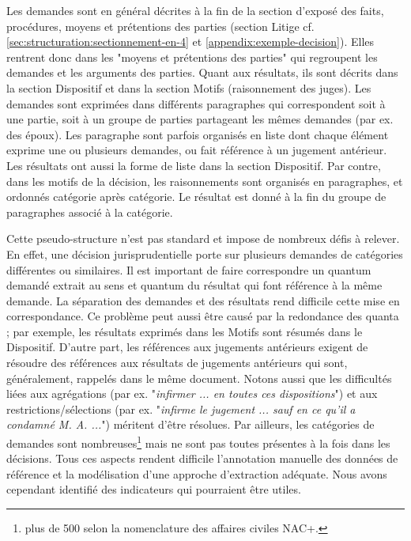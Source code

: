 Les demandes sont en général décrites à la fin de la section d'exposé des faits, procédures, moyens et prétentions des parties (section Litige cf. \ref{sec:structuration:sectionnement-en-4} et \ref{appendix:exemple-decision}). Elles rentrent donc dans les "moyens et prétentions des parties" qui regroupent les demandes et les arguments des parties. Quant aux résultats, ils sont décrits dans la section Dispositif et dans la section Motifs (raisonnement des juges). Les demandes sont exprimées dans différents paragraphes qui correspondent soit à une partie, soit à un groupe de parties partageant les mêmes demandes (par ex. des époux). Les paragraphe sont parfois organisés en liste dont chaque élément exprime une ou plusieurs demandes, ou fait référence à un jugement antérieur. Les résultats ont aussi la forme de liste dans la section Dispositif. Par contre, dans les motifs de la décision, les raisonnements sont organisés en paragraphes, et ordonnés catégorie après catégorie. Le résultat est donné à la fin du groupe de paragraphes associé à la catégorie.


 Cette pseudo-structure n'est pas standard et impose de nombreux défis à relever. En effet, une décision jurisprudentielle porte sur plusieurs demandes de catégories différentes ou similaires. Il est important de faire correspondre un quantum demandé extrait au sens et quantum du résultat qui font référence à la même demande. La séparation des demandes et des résultats rend difficile cette mise en correspondance. Ce problème peut aussi être causé par la redondance des quanta ; par exemple, les résultats exprimés dans les Motifs sont résumés dans le Dispositif. D'autre part, les références aux jugements antérieurs exigent de résoudre des références aux résultats de jugements antérieurs qui sont, généralement, rappelés dans le même document. Notons aussi que les difficultés liées aux agrégations (par ex. "\textit{infirmer ... en toutes ces dispositions}") et aux restrictions/sélections (par ex. "\textit{infirme le jugement ... sauf en ce qu'il a condamné M. A. ...}") méritent d'être résolues. Par ailleurs, les catégories de demandes sont nombreuses\footnote{plus de 500 selon la nomenclature des affaires civiles NAC+.} mais ne sont pas toutes présentes à la fois dans les décisions. Tous ces aspects rendent difficile l'annotation manuelle des données de référence et la modélisation d'une approche d'extraction adéquate. Nous avons cependant identifié des indicateurs qui pourraient être utiles.

